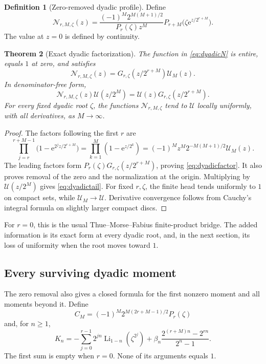 \documentclass[11pt,letterpaper]{article}
\numberwithin{equation}{section}
\newtheorem{theorem}{Theorem}[section]
\theoremstyle{definition}
\newtheorem{definition}[theorem]{Definition}
\theoremstyle{remark}
\newcommand{\Li}{\operatorname{Li}}
\newcommand{\Up}{\mathcal U}
\newcommand{\Np}{\mathcal N}
\newcommand{\e}{\mathrm e}
\begin{document}
\begin{definition}[Zero-removed dyadic profile]
Define
\begin{equation}
 \Np_{r,M,\zeta}(z)=
 \frac{(-1)^M2^{M(M+1)/2}}{P_r(\zeta)z^M}
 P_{r+M}\bigl(\zeta\e^{z/2^{r+M}}\bigr).
 \label{eq:dyadicN}
\end{equation}
The value at \(z=0\) is defined by continuity.
\end{definition}

\begin{theorem}[Exact dyadic factorization]
The function in \eqref{eq:dyadicN} is entire, equals \(1\) at zero, and satisfies
\begin{equation}
 \Np_{r,M,\zeta}(z)=G_{r,\zeta}(z/2^{r+M})\Up_M(z).
 \label{eq:dyadicfactor}
\end{equation}
In denominator-free form,
\begin{equation}
 \Np_{r,M,\zeta}(z)\Up(z/2^M)
 =\Up(z)G_{r,\zeta}(z/2^{r+M}).
 \label{eq:dyadictail}
\end{equation}
For every fixed dyadic root \(\zeta\), the functions \(\Np_{r,M,\zeta}\) tend to \(\Up\) locally uniformly, with all derivatives, as \(M\to\infty\).
\end{theorem}
\begin{proof}
The factors following the first \(r\) are
\[
 \prod_{j=r}^{r+M-1}\bigl(1-\e^{2^jz/2^{r+M}}\bigr)
 =\prod_{k=1}^{M}(1-\e^{z/2^k})
 =(-1)^Mz^M2^{-M(M+1)/2}\Up_M(z).
\]
The leading factors form \(P_r(\zeta)G_{r,\zeta}(z/2^{r+M})\), proving \eqref{eq:dyadicfactor}. It also proves removal of the zero and the normalization at the origin. Multiplying by \(\Up(z/2^M)\) gives \eqref{eq:dyadictail}. For fixed \(r,\zeta\), the finite head tends uniformly to \(1\) on compact sets, while \(\Up_M\to\Up\). Derivative convergence follows from Cauchy's integral formula on slightly larger compact discs.
\end{proof}

For \(r=0\), this is the usual Thue--Morse--Fabius finite-product bridge. The added information is its exact form at every dyadic root, and, in the next section, its loss of uniformity when the root moves toward \(1\).

\subsection{Every surviving dyadic moment}
The zero removal also gives a closed formula for the first nonzero moment and all moments beyond it. Define
\begin{equation}
 C_M=(-1)^M2^{M(2r+M-1)/2}P_r(\zeta)
 \label{eq:dyadicC}
\end{equation}
and, for \(n\geq1\),
\begin{equation}
 K_n=-\sum_{j=0}^{r-1}2^{jn}\Li_{1-n}(\zeta^{2^j})
       +\beta_n\frac{2^{(r+M)n}-2^{rn}}{2^n-1}.
 \label{eq:dyadicK}
\end{equation}
The first sum is empty when \(r=0\). None of its arguments equals \(1\).
\end{document}
